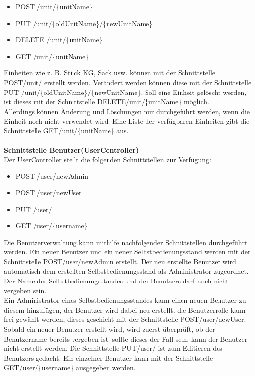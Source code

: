 \begin{itemize}
	\itemsep0pt
	\item  POST /unit/\{unitName\}
	\item  PUT /unit/\{oldUnitName\}/\{newUnitName\}
	\item  DELETE /unit/\{unitName\}
	\item  GET /unit/\{unitName\}
\end{itemize}
Einheiten wie z. B. Stück KG, Sack usw. können mit der Schnittstelle POST/unit/ erstellt werden. Verändert werden können diese mit der Schnittstelle PUT /unit/\{oldUnitName\}/\{newUnitName\}. Soll eine Einheit gelöscht werden, ist dieses mit der Schnittstelle DELETE/unit/\{unitName\} möglich.
\\ Allerdings können Änderung und Löschungen nur durchgeführt werden, wenn die Einheit noch nicht verwendet wird.
Eine Liste der verfügbaren Einheiten gibt die Schnittstelle GET/unit/\{unitName\} aus.
\\
\\
\textbf{Schnittstelle Benutzer(UserController)}
\\
Der UserController stellt die folgenden Schnittstellen zur Verfügung:

\begin{itemize}
	\itemsep0pt
	\item  POST /user/newAdmin
	\item  POST /user/newUser
	\item  PUT /user/
	\item  GET /user/\{username\}
\end{itemize}

Die Benutzerverwaltung kann mithilfe nachfolgender Schnittstellen durchgeführt werden. Ein neuer Benutzer und ein neuer Selbstbedienungsstand werden mit der Schnittstelle POST/user/newAdmin erstellt. Der neu erstellte Benutzer wird automatisch dem erstellten Selbstbedienungsstand als Administrator zugeordnet. Der Name des Selbstbedienungsstandes und des Benutzers darf noch nicht vergeben sein.
\\
Ein Administrator eines Selbstbedienungsstandes kann einen neuen Benutzer zu diesem hinzufügen, der Benutzer wird dabei neu erstellt, die Benutzerrolle kann frei gewählt werden, dieses geschieht mit der Schnittstelle POST/user/newUser.
\\
Sobald ein neuer Benutzer erstellt wird, wird zuerst überprüft, ob der Benutzername bereits vergeben ist, sollte dieses der Fall sein, kann der Benutzer nicht erstellt werden. Die Schnittstelle PUT/user/ ist zum Editieren des Benutzers gedacht. Ein einzelner Benutzer kann mit der Schnittstelle GET/user/\{username\} ausgegeben werden.

